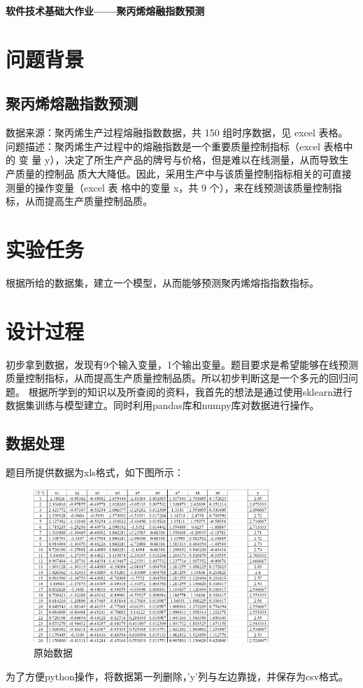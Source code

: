 \documentclass{source/Experiment}
\title{}
\date{\today}
\begin{document}
\begin{center}
    \vspace{0.5cm}
    \bfseries\Large{软件技术基础大作业——聚丙烯熔融指数预测}
\end{center}

\section{问题背景}
\subsection{聚丙烯熔融指数预测}
数据来源：聚丙烯生产过程熔融指数数据，共 150 组时序数据，见 excel 表格。 问题描述：聚丙烯生产过程中的熔融指数是一个重要质量控制指标（excel 表格中的 变 量 y），决定了所生产产品的牌号与价格，但是难以在线测量，从而导致生产质量的控制品 质大大降低。因此，采用生产中与该质量控制指标相关的可直接测量的操作变量（excel 表 格中的变量 x，共 9 个），来在线预测该质量控制指标，从而提高生产质量控制品质。

\section{实验任务}

根据所给的数据集，建立一个模型，从而能够预测聚丙烯熔指指数指标。

\section{设计过程}
初步拿到数据，发现有9个输入变量，1个输出变量。题目要求是希望能够在线预测质量控制指标，从而提高生产质量控制品质。所以初步判断这是一个多元的回归问题。
根据所学到的知识以及所查阅的资料，我首先的想法是通过使用sklearn进行数据集训练与模型建立。同时利用pandas库和numpy库对数据进行操作。
\subsection{数据处理}
题目所提供数据为xls格式，如下图所示：
\begin{figure}[H]
    \centering
    \includegraphics[width = 0.8\textwidth]{原始数据}
    \caption{原始数据}
\end{figure}
为了方便python操作，将数据第一列删除，'y'列与左边靠拢，并保存为csv格式。
\end{document}
